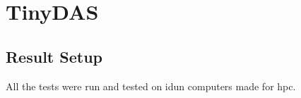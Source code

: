 \section{TinyDAS}
\label{res:tinydas}




\subsection{Result Setup}
All the tests were run and tested on \gls{idun} computers made for \acrshort{hpc}. 





